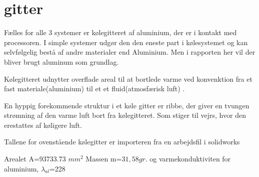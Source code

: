 \chapter{gitter}

Fælles for alle 3 systemer er kølegitteret af aluminium, der er i kontakt med processoren. 
I simple systemer udgør den den eneste part i kølesystemet og kan selvfølgelig bestå af andre materialer end Aluminium. 
Men i rapporten her vil der bliver brugt aluminum som grundlag. 

Kølegitteret udnytter overflade areal til at bortlede varme ved konvenktion fra et fast materiale(aluminium) til et et fluid(atmosfærisk luft) .

En hyppig forekommende struktur i et køle gitter er ribbe, der giver en tvungen strømning af den varme luft bort fra kølegitteret. Som stiger til vejrs, hvor den erestattes af køligere luft. 





Tallene for ovenstående kølegitter er importeren fra en arbejdsfil i solidworks

Arealet A=93733.73 $mm^2$  Massen m=$31,58 gr.$ og varmekonduktiviten for aluminium, $\lambda_{al}$=228 

